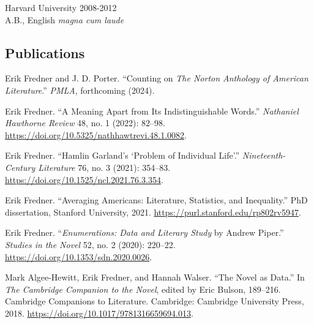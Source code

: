 \documentclass[
  12pt,
  letterpaper,
]{article}
\newlength{\cslhangindent}
\newlength{\cslentryspacingunit} %
\newenvironment{CSLReferences}[2] %
 {%
  \setlength{\parindent}{0pt}
  \ifodd #1
  \let\oldpar\par
  \def\par{\hangindent=\cslhangindent\oldpar}
  \fi
  \setlength{\parskip}{#2\cslentryspacingunit}
 }%
 {}
\begin{document}
Harvard University \hfill 2008-2012\\
\hspace*{0.333em} A.B., English \emph{magna cum laude}

\hypertarget{pubs}{%
\subsection{Publications}\label{pubs}}
\bigskip
\begin{CSLReferences}{1}{0}

\leavevmode{}%
Erik Fredner and J. D. Porter. {``Counting on {\emph{The Norton
Anthology of American Literature}}.''} \emph{PMLA}, forthcoming (2024).

\medskip

\leavevmode{}%
Erik Fredner. {``A {Meaning Apart} from {Its Indistinguishable
Words}.''} \emph{Nathaniel Hawthorne Review} 48, no. 1 (2022): 82--98.
\url{https://doi.org/10.5325/nathhawtrevi.48.1.0082}.

\medskip

\leavevmode{}%
Erik Fredner. {``Hamlin {Garland}'s {`{Problem} of {Individual Life}'}.''}
\emph{Nineteenth-Century Literature} 76, no. 3 (2021): 354--83.
\url{https://doi.org/10.1525/ncl.2021.76.3.354}.

\medskip

\leavevmode{}%
Erik Fredner. {``Averaging {Americans}: {Literature}, {Statistics}, and
{Inequality}.''} PhD dissertation, Stanford University, 2021.
\url{https://purl.stanford.edu/rp802rv5947}.

\medskip

\leavevmode{}%
Erik Fredner. {``\emph{Enumerations: {Data} and {Literary Study}} by {Andrew
Piper}.''} \emph{Studies in the Novel} 52, no. 2 (2020): 220--22.
\url{https://doi.org/10.1353/sdn.2020.0026}.

\medskip

\leavevmode{}%
Mark Algee-Hewitt, Erik Fredner, and Hannah Walser. {``The {Novel} as
{Data}.''} In \emph{The {Cambridge Companion} to the {Novel}}, edited by
Eric Bulson, 189--216. Cambridge {Companions} to {Literature}.
{Cambridge}: {Cambridge University Press}, 2018.
\url{https://doi.org/10.1017/9781316659694.013}.


\end{CSLReferences}
\end{document}
